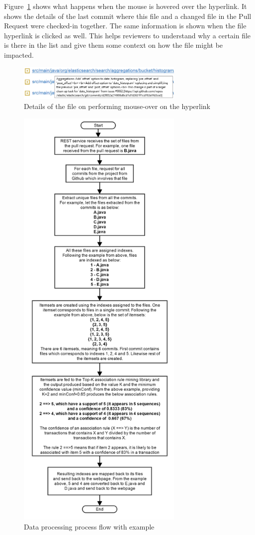 Figure~\ref{fig:mouseOverOnFile} shows what happens when the mouse is hovered over the hyperlink. It shows the details of the last commit where this file and a changed file in the Pull Request were checked-in together. The same information is shown when the file hyperlink is clicked as well. This helps reviewers to understand why a certain file is there in the list and give them some context on how the file might be impacted.


\begin{figure}[ht!]
\centering
\includegraphics[width=8cm]{MouseOverOfFile}
\caption{Details of the file on performing mouse-over on the hyperlink}
\label{fig:mouseOverOnFile}
\end{figure}

\begin{figure}[ht!]
\includegraphics[width=8cm]{data_processing_spmf}
\caption{Data processing process flow with example}
\label{fig:data_processing_spmf}
\end{figure}


